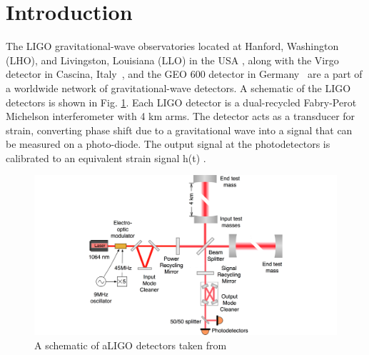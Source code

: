\documentclass[12pt]{iopart}
\begin{document}
%
%



\section{Introduction}\label{introduction}

The LIGO  gravitational-wave observatories located at Hanford, Washington (LHO), and Livingston, Louisiana (LLO) in the USA \cite{TheLIGOScientific:2014jea}, along with the Virgo detector in Cascina, Italy~\cite{Acernese_2014}, and the GEO 600 detector in Germany~\cite{Dooley_2016} are a part of a worldwide network of gravitational-wave detectors. 
A schematic of the LIGO detectors is shown in Fig. \ref{fig:schematic}.
Each LIGO detector is a dual-recycled Fabry-Perot Michelson interferometer with 4 km arms. The detector acts as a transducer for strain, converting phase shift due to a gravitational wave into a signal that can be measured on a photo-diode. The output signal at the photodetectors is calibrated to an equivalent strain signal h(t) \cite{Abbott_2017,Viets_2018}.

\begin{figure}[h]
    \centering
    \includegraphics[width=12cm]{ligo-schematic.png}
    \caption{A schematic of aLIGO detectors taken from {~\cite{Martynov_2016}} }
    \label{fig:schematic}
\end{figure}
\end{document}

